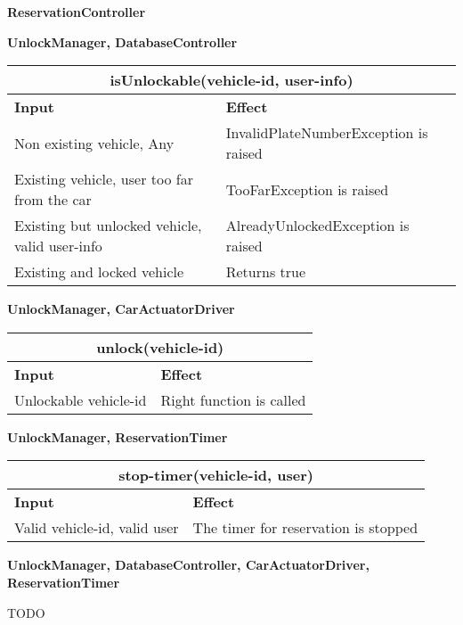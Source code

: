 
\begin{Large}
\textbf{ReservationController}
\end{Large}

\textbf{UnlockManager, DatabaseController}\\
\begin{tabular}{|p{5cm}|p{7cm}|}
\hline
\multicolumn{2}{|c|}{isUnlockable(vehicle-id, user-info)}\\
\hline
\textbf{Input} & \textbf{Effect}\\

\hline
Non existing vehicle, Any & InvalidPlateNumberException is raised\\

\hline
Existing vehicle, user too far from the car & TooFarException is raised\\

\hline
Existing but unlocked vehicle, valid user-info & AlreadyUnlockedException is raised\\

\hline
Existing and locked vehicle & Returns true\\
\hline
\end{tabular}

\textbf{UnlockManager, CarActuatorDriver}\\
\begin{tabular}{|p{5cm}|p{7cm}|}
\hline
\multicolumn{2}{|c|}{unlock(vehicle-id)}\\
\hline
\textbf{Input} & \textbf{Effect}\\

\hline
Unlockable vehicle-id & Right function is called\\
\hline
\end{tabular}

\textbf{UnlockManager, ReservationTimer}\\
\begin{tabular}{|p{5cm}|p{7cm}|}
\hline
\multicolumn{2}{|c|}{stop-timer(vehicle-id, user)} \\
\hline
\textbf{Input} & \textbf{Effect} \\

\hline
Valid vehicle-id, valid user & The timer for reservation is stopped \\
\hline
\end{tabular}

\textbf{UnlockManager, DatabaseController, CarActuatorDriver, ReservationTimer} \\
\begin{Huge}
TODO
\end{Huge}

